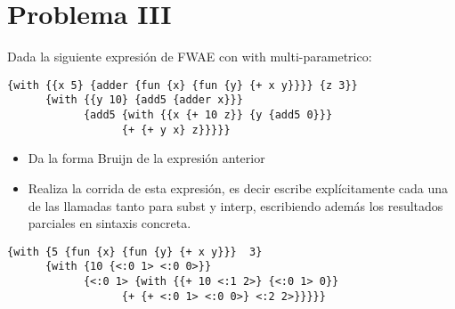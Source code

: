 \documentclass[a4paper]{article}
\begin{document}
\section{Problema III}
Dada la siguiente expresión de FWAE con with multi-parametrico:
\begin{verbatim}
{with {{x 5} {adder {fun {x} {fun {y} {+ x y}}}} {z 3}}
      {with {{y 10} {add5 {adder x}}}
            {add5 {with {{x {+ 10 z}} {y {add5 0}}}
                  {+ {+ y x} z}}}}}
\end{verbatim}
\begin{itemize}
\item Da la forma Bruijn de la expresión anterior
\item Realiza la corrida de esta expresión, es decir escribe explícitamente cada una de las llamadas tanto para subst y interp, escribiendo además los resultados parciales en sintaxis concreta.
\end{itemize}

\begin{verbatim}
{with {5 {fun {x} {fun {y} {+ x y}}}  3}
      {with {10 {<:0 1> <:0 0>}}
            {<:0 1> {with {{+ 10 <:1 2>} {<:0 1> 0}}
                  {+ {+ <:0 1> <:0 0>} <:2 2>}}}}}
\end{verbatim}
\end{document}
